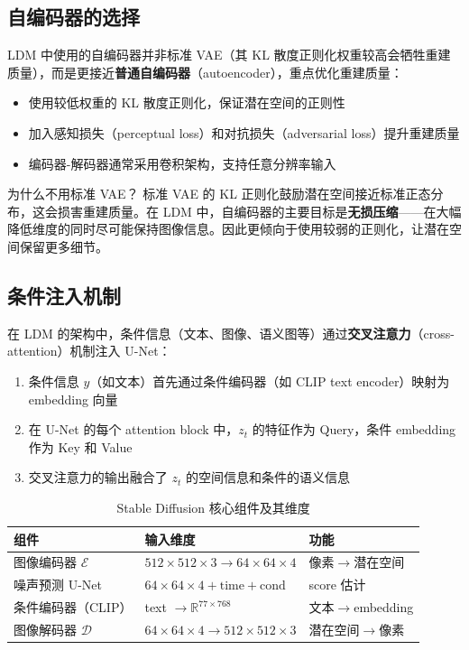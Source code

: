 \documentclass[a4paper]{article}
\begin{document}
\subsection{自编码器的选择}

LDM 中使用的自编码器并非标准 VAE（其 KL 散度正则化权重较高会牺牲重建质量），而是更接近\textbf{普通自编码器}（autoencoder），重点优化重建质量：

\begin{itemize}
    \item 使用较低权重的 KL 散度正则化，保证潜在空间的正则性
    \item 加入感知损失（perceptual loss）和对抗损失（adversarial loss）提升重建质量
    \item 编码器-解码器通常采用卷积架构，支持任意分辨率输入
\end{itemize}

\begin{knowledgebox}{为什么不用标准 VAE？}
标准 VAE 的 KL 正则化鼓励潜在空间接近标准正态分布，这会损害重建质量。在 LDM 中，自编码器的主要目标是\textbf{无损压缩}——在大幅降低维度的同时尽可能保持图像信息。因此更倾向于使用较弱的正则化，让潜在空间保留更多细节。
\end{knowledgebox}

\subsection{条件注入机制}

在 LDM 的架构中，条件信息（文本、图像、语义图等）通过\textbf{交叉注意力}（cross-attention）机制注入 U-Net：

\begin{enumerate}
    \item 条件信息 $y$（如文本）首先通过条件编码器（如 CLIP text encoder）映射为 embedding 向量
    \item 在 U-Net 的每个 attention block 中，$z_t$ 的特征作为 Query，条件 embedding 作为 Key 和 Value
    \item 交叉注意力的输出融合了 $z_t$ 的空间信息和条件的语义信息
\end{enumerate}

\begin{table}[H]
\centering
\begin{tabular}{lll}
\toprule
\textbf{组件} & \textbf{输入维度} & \textbf{功能} \\
\midrule
图像编码器 $\mathcal{E}$ & $512\times512\times3 \to 64\times64\times4$ & 像素$\to$潜在空间 \\
噪声预测 U-Net & $64\times64\times4 + \text{time} + \text{cond}$ & score 估计 \\
条件编码器（CLIP） & text $\to \mathbb{R}^{77\times768}$ & 文本$\to$embedding \\
图像解码器 $\mathcal{D}$ & $64\times64\times4 \to 512\times512\times3$ & 潜在空间$\to$像素 \\
\bottomrule
\end{tabular}
\caption{Stable Diffusion 核心组件及其维度}
\end{table}
\end{document}
